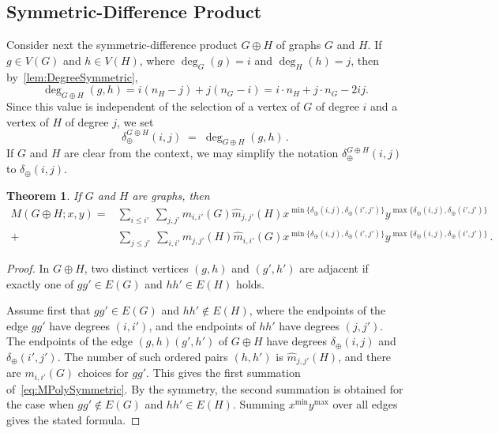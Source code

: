 \documentclass[letterpaper,12pt]{article}
\newtheorem{theorem}{Theorem}[section]
\begin{document}
\subsection{Symmetric-Difference Product}
 \label{sec:Symmetric}

Consider next the symmetric-difference product $G\oplus H$ of graphs $G$ and $H$. If $g\in V(G)$ and $h\in V(H)$, where $\deg_G(g)=i$ and $\deg_H(h)=j$, then by~\eqref{lem:DegreeSymmetric}, 
\begin{equation}
    \deg_{G\oplus H}(g,h) = i(n_H-j)+j(n_G-i)= i\cdot n_H+j\cdot n_G-2ij.
\end{equation}
Since this value is independent of the selection of a vertex of $G$ of degree $i$ and a vertex of $H$ of degree $j$, we set 
$$\delta_{\oplus}^{G\oplus H}(i,j)\;=\;\deg_{G\oplus H}(g,h)\,.$$
If $G$ and $H$ are clear from the context, we may simplify the notation $\delta_{\oplus}^{G\oplus H}(i,j)$ to $\delta_{\oplus}(i,j)$. 

\begin{theorem}
\label{thm:MP-XOR}
If $G$ and $H$ are graphs, then 
\begin{equation}\label{eq:MPolySymmetric}
    \begin{aligned}
M(G\oplus H;x,y)
={}&
\sum_{ i\le i' }\ \sum_{j,j'}
m_{i,i'}(G) \widehat m_{j,j'}(H) 
x^{\min\{\delta_{\oplus}(i,j), \delta_{\oplus}(i',j')\}}
y^{\max\{\delta_{\oplus}(i,j), \delta_{\oplus}(i',j')\}}
\\
+&
\sum_{j\le j'}\ \sum_{i,i'}
m_{j,j'}(H) \widehat m_{i,i'}(G) 
x^{\min\{\delta_{\oplus}(i,j), \delta_{\oplus}(i',j')\}}
y^{\max\{\delta_{\oplus}(i,j), \delta_{\oplus}(i',j')\}}\,.
\end{aligned}
\end{equation}
\end{theorem}

\begin{proof}
In $G\oplus H$, two distinct vertices $(g,h)$ and $(g',h')$ are adjacent if exactly one of $gg'\in E(G)$ and $hh'\in E(H)$ holds. 

Assume first that $gg'\in E(G)$ and $hh'\notin E(H)$, where the endpoints of the edge $gg'$ have degrees $(i,i')$, and the endpoints of $hh'$ have degrees $(j,j')$. The endpoints of the edge $(g,h)(g',h')$ of $G\oplus H$ have degrees $\delta_{\oplus}(i,j)$ and $\delta_{\oplus}(i',j')$. The number of such ordered pairs $(h,h')$ is $\widehat m_{j,j'}(H)$, and there are $m_{i,i'}(G)$ choices for $gg'$. This gives the first summation of~\eqref{eq:MPolySymmetric}. By the symmetry, the second summation is obtained for the case when $gg'\notin E(G)$ and $hh'\in E(H)$. Summing $x^{\min}y^{\max}$ over all edges gives the stated
formula.
\end{proof}
\end{document}
